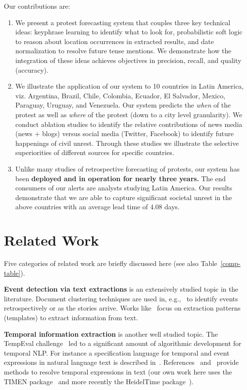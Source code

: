 \documentclass[letterpaper]{article}
\begin{document}
Our contributions are:

\begin{enumerate}
\item We present a protest forecasting system that couples three key
  technical ideas: keyphrase learning to identify what to look for,
  probabilistic soft logic to reason about location occurrences in
  extracted results, and date normalization to resolve future tense
  mentions. We demonstrate how the integration of these ideas achieves
  objectives in precision, recall, and quality (accuracy).
\item We illustrate the application of our system to 10 countries in
  Latin America, viz. Argentina, Brazil, Chile, Colombia, Ecuador, El
  Salvador, Mexico, Paraguay, Uruguay, and Venezuela. Our system
  predicts the {\it when} of the protest as well as {\it where} of the
  protest (down to a city level granularity).  We conduct ablation
  studies to identify the relative contributions of news media (news +
  blogs) versus social media (Twitter, Facebook) to identify future
  happenings of civil unrest. Through these studies we illustrate the
  selective superiorities of different sources for specific countries.
\item Unlike many studies of retrospective forecasting of protests, our
  system has been {\bf deployed and in operation for nearly three
  years.} The end consumers of our alerts are analysts studying Latin
  America.
Our results demonstrate that we are able to capture significant societal
unrest in the above countries with an average lead time of 4.08 days. 
\end{enumerate}

\section{Related Work}
Five categories of related work are briefly discussed here (see also
Table~\ref{comp-table}).

{\bf Event detection via text extractions}
is an extensively studied topic in the literature. Document clustering techniques are used 
in, e.g.,~\cite{Gabrilovich:2004:NPP} to identify events retrospectively or as the stories arrive.
Works like~\cite{Banko07openinformation,Chambers:2011:TIE,riloff2003learning} focus on
extraction patterns (templates) to extract information from text. 

{\bf Temporal information extraction} is another well studied topic.
The TempEval challenge~\cite{tempeval} led to a significant amount of
algorithmic development for temporal NLP.
For instance a specification language
for temporal and event expressions in natural language text is described in~\cite{timeml}.
References~\cite{LlorensDGS12} and~\cite{tempex} provide methods to
resolve temporal expressions in text (our own work here uses the TIMEN
package~\cite{LlorensDGS12} and more recently the HeidelTime
package~\cite{strotgen2014time}).
\end{document}
